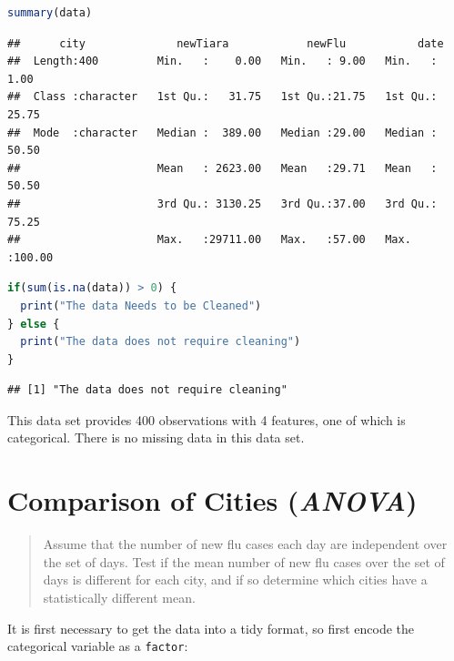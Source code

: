 \documentclass{article}
\newcommand{\passthrough}[1]{#1}
\renewcommand{\thesection}{\S ~ \Alph{section} ~ }
\renewcommand{\thesubsection}{ ~ \Alph{section}(\arabic{subsection}) ~ }
\renewcommand{\thesubsubsection}{ ~ \Alph{section}(\arabic{subsection})(\arabic{subsubsection}) ~ }
\begin{document}
\begin{lstlisting}[language=R]
summary(data)
\end{lstlisting}

\begin{lstlisting}
##      city              newTiara            newFlu           date       
##  Length:400         Min.   :    0.00   Min.   : 9.00   Min.   :  1.00  
##  Class :character   1st Qu.:   31.75   1st Qu.:21.75   1st Qu.: 25.75  
##  Mode  :character   Median :  389.00   Median :29.00   Median : 50.50  
##                     Mean   : 2623.00   Mean   :29.71   Mean   : 50.50  
##                     3rd Qu.: 3130.25   3rd Qu.:37.00   3rd Qu.: 75.25  
##                     Max.   :29711.00   Max.   :57.00   Max.   :100.00
\end{lstlisting}

\begin{lstlisting}[language=R]
if(sum(is.na(data)) > 0) {
  print("The data Needs to be Cleaned")
} else {
  print("The data does not require cleaning")
}
\end{lstlisting}

\begin{lstlisting}
## [1] "The data does not require cleaning"
\end{lstlisting}

This data set provides 400 observations with 4 features, one of which is
categorical. There is no missing data in this data set.



 \renewcommand{\thesection}{\S ~ \arabic{section} ~ }
 \setcounter{section}{0}
 \renewcommand{\thesubsection}{ ~ \arabic{section}.\arabic{subsection} ~ }
 \renewcommand{\thesubsubsection}{ ~ \arabic{section}.\arabic{subsection}.\arabic{subsubsection} ~ }

\hypertarget{question-1}{%
\section{Comparison of Cities \normalsize \qquad (\textit{ANOVA})}\label{question-1}}

\begin{quote}
Assume that the number of new flu cases each day are independent over
the set of days. Test if the mean number of new flu cases over the set
of days is different for each city, and if so determine which cities
have a statistically different mean.
\end{quote}

It is first necessary to get the data into a tidy format, so first
encode the categorical variable as a \passthrough{\lstinline!factor!}:
\end{document}
